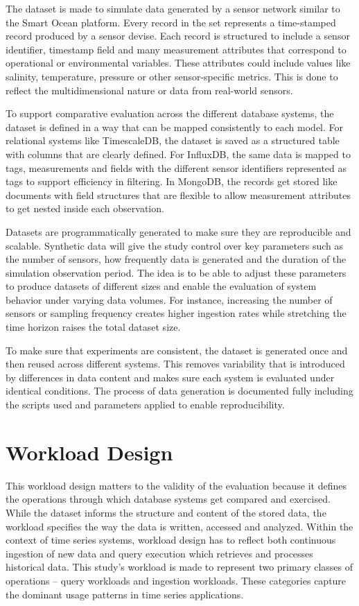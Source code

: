 The dataset is made to simulate data generated by a sensor network similar to the Smart Ocean platform. Every record in the set represents a time-stamped record produced by a sensor devise. Each record is structured to include a sensor identifier, timestamp field and many measurement attributes that correspond to operational or environmental variables. These attributes could include values like salinity, temperature, pressure or other sensor-specific metrics. This is done to reflect the multidimensional nature or data from real-world sensors. 


To support comparative evaluation across the different database systems, the dataset is defined in a way that can be mapped consistently to each model. For relational systems like TimescaleDB, the dataset is saved as a structured table with columns that are clearly defined. For InfluxDB, the same data is mapped to tags, measurements and fields with the different sensor identifiers represented as tags to support efficiency in filtering. In MongoDB, the records get stored like documents with field structures that are flexible to allow measurement attributes to get nested inside each observation. 


Datasets are programmatically generated to make sure they are reproducible and scalable. Synthetic data will give the study control over key parameters such as the number of sensors, how frequently data is generated and the duration of the simulation observation period. The idea is to be able to adjust these parameters to produce datasets of different sizes and enable the evaluation of system behavior under varying data volumes. For instance, increasing the number of sensors or sampling frequency creates higher ingestion rates while stretching the time horizon raises the total dataset size.


To make sure that experiments are consistent, the dataset is generated once and then reused across different systems. This removes variability that is introduced by differences in data content and makes sure each system is evaluated under identical conditions. The process of data generation is documented fully including the scripts used and parameters applied to enable reproducibility. 


\section{Workload Design}
This workload design matters to the validity of the evaluation because it defines the operations through which database systems get compared and exercised. While the dataset informs the structure and content of the stored data, the workload specifies the way the data is written, accessed and analyzed. Within the context of time series systems, workload design has to reflect both continuous ingestion of new data and query execution which retrieves and processes historical data. This study’s workload is made to represent two primary classes of operations – query workloads and ingestion workloads. These categories capture the dominant usage patterns in time series applications.


